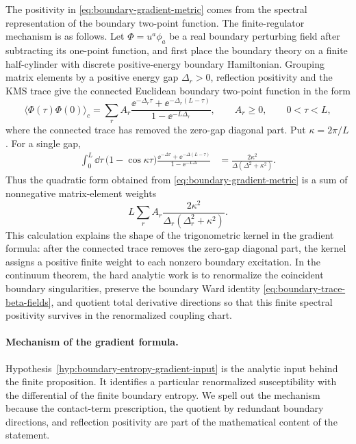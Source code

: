 The positivity in
\eqref{eq:boundary-gradient-metric} comes from the spectral representation
of the boundary two-point function.  The finite-regulator mechanism is as
follows.  Let
\(\Phi=u^a\phi_a\) be a real boundary perturbing field after subtracting its
one-point function, and first place the boundary theory on a finite
half-cylinder with discrete positive-energy boundary Hamiltonian.  Grouping
matrix elements by a positive energy gap \(\Delta_r>0\), reflection
positivity and the KMS trace give the connected Euclidean boundary two-point
function in the form
\begin{equation}
  \langle\Phi(\tau)\Phi(0)\rangle_c
  =
  \sum_r A_r
  \frac{\ee^{-\Delta_r\tau}
        +\ee^{-\Delta_r(L-\tau)}}
       {1-\ee^{-L\Delta_r}},
  \qquad
  A_r\ge0,\qquad 0<\tau<L ,
  \label{eq:bcft-boundary-spectral-two-point}
\end{equation}
where the connected trace has removed the zero-gap diagonal part.  Put
\(\kappa=2\pi/L\).  For a single gap,
\begin{align}
  \int_0^L\!\dd\tau\,
  \bigl(1-\cos \kappa\tau\bigr)
  \frac{\ee^{-\Delta\tau}
        +\ee^{-\Delta(L-\tau)}}{1-\ee^{-L\Delta}}
  &=
  \frac{2\kappa^2}{\Delta(\Delta^2+\kappa^2)} .
  \label{eq:bcft-boundary-gradient-spectral-weight}
\end{align}
Thus the quadratic form obtained from
\eqref{eq:boundary-gradient-metric} is a sum of nonnegative matrix-element
weights
\[
  L\sum_r A_r
  \frac{2\kappa^2}{\Delta_r(\Delta_r^2+\kappa^2)} .
\]
This calculation explains the shape of the trigonometric kernel in the
gradient formula: after the connected trace removes the zero-gap diagonal
part, the kernel assigns a positive finite weight to each nonzero boundary
excitation.  In the continuum theorem, the hard analytic work is to
renormalize the coincident boundary singularities, preserve the boundary Ward
identity \eqref{eq:boundary-trace-beta-fields}, and quotient total
derivative directions so that this finite spectral positivity survives in
the renormalized coupling chart.

\paragraph{Mechanism of the gradient formula.}
Hypothesis~\ref{hyp:boundary-entropy-gradient-input} is the analytic input
behind the finite proposition.  It identifies a particular renormalized
susceptibility with the differential of the finite boundary entropy.  We spell
out the mechanism because the contact-term prescription, the quotient by
redundant boundary directions, and reflection positivity are part of the
mathematical content of the statement.

